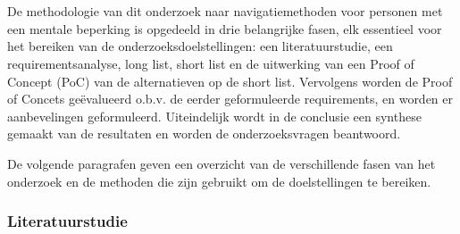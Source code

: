 
\chapter{}%
\label{ch:methodologie}


De methodologie van dit onderzoek naar navigatiemethoden voor personen met een mentale beperking is opgedeeld in drie belangrijke fasen, elk essentieel voor het bereiken van de onderzoeksdoelstellingen: een literatuurstudie, een requirementsanalyse, long list, short list en de uitwerking van een Proof of Concept (PoC) van de alternatieven op de short list. Vervolgens worden de Proof of Concets geëvalueerd o.b.v. de eerder geformuleerde requirements, en worden er aanbevelingen geformuleerd. Uiteindelijk wordt in de conclusie een synthese gemaakt van de resultaten en worden de onderzoeksvragen beantwoord.

De volgende paragrafen geven een overzicht van de verschillende fasen van het onderzoek en de methoden die zijn gebruikt om de doelstellingen te bereiken.

\subsection*{Literatuurstudie}

